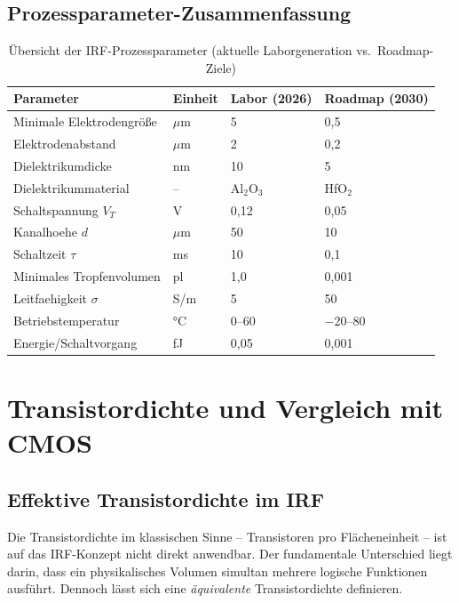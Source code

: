 ﻿\documentclass[a4paper,12pt]{scrreprt}
\theoremstyle{definition}
\begin{document}
\subsection{Prozessparameter-Zusammenfassung}

\begin{table}[H]
	\centering
	\caption{Übersicht der IRF-Prozessparameter (aktuelle Laborgeneration vs.\ Roadmap-Ziele)}
	\label{tab:prozessparameter}
	\begin{tabular}{llll}
		\toprule
		\textbf{Parameter} & \textbf{Einheit} & \textbf{Labor (2026)} & \textbf{Roadmap (2030)} \\
		\midrule
		Minimale Elektrodengröße & $\mu$m & 5 & 0{,}5 \\
		Elektrodenabstand & $\mu$m & 2 & 0{,}2 \\
		Dielektrikumdicke & nm & 10 & 5 \\
		Dielektrikummaterial & -- & Al$_2$O$_3$ & HfO$_2$ \\
		Schaltspannung $V_T$ & V & 0{,}12 & 0{,}05 \\
		Kanalhoehe $d$ & $\mu$m & 50 & 10 \\
		Schaltzeit $\tau$ & ms & 10 & 0{,}1 \\
		Minimales Tropfenvolumen & pl & 1{,}0 & 0{,}001 \\
		Leitfaehigkeit $\sigma$ & S/m & 5 & 50 \\
		Betriebstemperatur &  °C & 0--60 & $-$20--80 \\
		Energie/Schaltvorgang & fJ & 0{,}05 & 0{,}001 \\
		\bottomrule
	\end{tabular}
\end{table}

\section{Transistordichte und Vergleich mit CMOS}

\subsection{Effektive Transistordichte im IRF}

Die Transistordichte im klassischen Sinne -- Transistoren pro Flächeneinheit --
ist auf das IRF-Konzept nicht direkt anwendbar. Der fundamentale Unterschied
liegt darin, dass ein physikalisches Volumen simultan mehrere logische Funktionen
ausführt. Dennoch lässt sich eine \emph{äquivalente} Transistordichte definieren.
\end{document}
